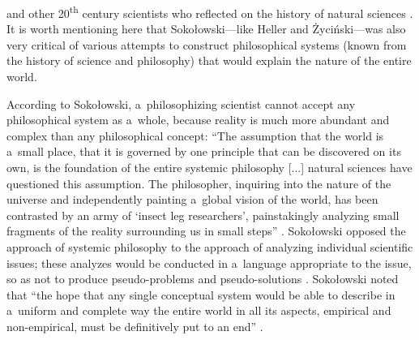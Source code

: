\documentclass[%
  manuscript=article,
  year=2024,
  volume=77,
  doi=00000.000,
]{zfn}
\begin{document}
\parencite[][]{Heller1992BFilozofia} %
 and other 20\textsuperscript{th} century scientists who reflected on the history of natural sciences 
\parencites[][]{Wilson2011Konsiliencja}[][]{Schrodinger2017Przyroda}. %
 It is worth mentioning here that Sokołowski---like Heller and Życiński---was also very critical of various attempts to construct philosophical systems (known from the history of science and philosophy) that would explain the nature of the entire world.



According to Sokołowski, a~philosophizing scientist cannot accept any philosophical system as a~whole, because reality is much more abundant and complex than any philosophical concept: ``The assumption that the world is a~small place, that it is governed by one principle that can be discovered on its own, is the foundation of the entire systemic philosophy [...] natural sciences have questioned this assumption. The philosopher, inquiring into the nature of the universe and independently painting a~global vision of the world, has been contrasted by an army of ‘insect leg researchers', painstakingly analyzing small fragments of the reality surrounding us in small steps''
\parencite[][p.45]{Sokoowski1989Gos}. %
 Sokołowski opposed the approach of systemic philosophy to the approach of analyzing individual scientific issues; these analyzes would be conducted in a~language appropriate to the issue, so as not to produce pseudo-problems and pseudo-solutions 
\parencite[][p.207]{Sokoowski1986Pluralizm}. %
 Sokołowski noted that ``the hope that any single conceptual system would be able to describe in a~uniform and complete way the entire world in all its aspects, empirical and non-empirical, must be definitively put to an end'' 
\parencite[][]{Sokoowski1986Pluralizm}.%
\end{document}

